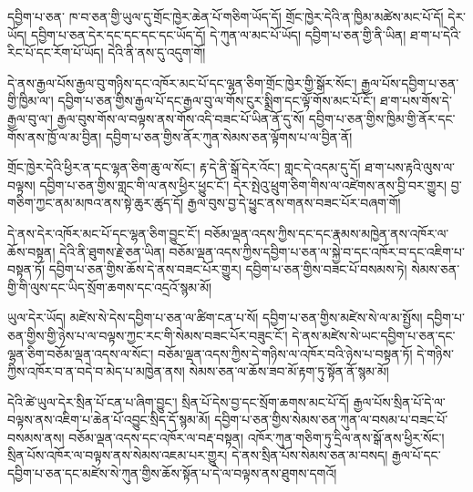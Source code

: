 \documentclass[12pt]{nextbook}
\begin{document}
\begin{readersection}{དབྱིག་པ་ཅན་}
ཁ་བ་ཅན་གྱི་ཡུལ་དུ་གྲོང་ཁྱེར་ཆེན་པོ་གཅིག་ཡོད་དོ། གྲོང་ཁྱེར་དེའི་ན་ཁྱིམ་མཚེས་མང་པོ་དོ། དེར་ཡོད། དབྱིག་པ་ཅན་དེར་དང་དང་དང་དང་ཡོད་དོ། དེ་ཀུན་ལ་མང་པོ་ཡོད། དབྱིག་པ་ཅན་གྱི་ནི་ཡིན། ཐ་ག་པ་དེའི་རིང་པོ་དང་རོག་པོ་ཡོད། དེའི་ནི་ནས་དུ་འདུག་གོ།

དེ་ནས་རྒྱལ་པོས་རྒྱལ་བུ་གཉིས་དང་འཁོར་མང་པོ་དང་ལྷན་ཅིག་གྲོང་ཁྱེར་གྱི་སྒོར་སོང་། རྒྱལ་པོས་དབྱིག་པ་ཅན་གྱི་ཁྱིམ་ལ་། དབྱིག་པ་ཅན་གྱིས་རྒྱལ་པོ་དང་རྒྱལ་བུ་ལ་གོས་ངུར་སྨྲིག་དང་ལྟོ་གོས་མང་པོ་ངོ་། ཐ་ག་པས་གོས་དེ་རྒྱལ་བུ་ལ་། རྒྱལ་བུས་གོས་ལ་བལྟས་ནས་གོས་འདི་བཟང་པོ་ཡིན་ནོ་དུ་སོ། དབྱིག་པ་ཅན་གྱིས་ཁྱིམ་གྱི་ནོར་དང་གོས་ནས་ཁྱོ་ལ་མ་བྱིན། དབྱིག་པ་ཅན་གྱིས་ནོར་ཀུན་སེམས་ཅན་ལྟོགས་པ་ལ་བྱིན་ནོ།

གྲོང་ཁྱེར་དེའི་ཕྱིར་ན་དང་ལྷན་ཅིག་ཆུ་ལ་སོང་། རྟ་དེ་ནི་སྒོ་དེར་འོང་། གླང་དེ་འདམ་དུ་དོ། ཐ་ག་པས་རྟའི་ལུས་ལ་བལྟས། དབྱིག་པ་ཅན་གྱིས་གླང་གི་ལ་ནས་ཕྱིར་ཕྱུང་ངོ་། དེར་སྤེའུ་ཕྲུག་ཅིག་གིས་ལ་འཛེགས་ནས་བྱི་བར་གྱུར། བྱ་གཅིག་ཀྱང་ནམ་མཁའ་ནས་སྟེ་ཆུར་ཚུད་དོ། རྒྱལ་བུས་བྱ་དེ་ཕྱུང་ནས་གནས་བཟང་པོར་བཞག་གོ།

དེ་ནས་དེར་འཁོར་མང་པོ་དང་ལྷན་ཅིག་བྱུང་ངོ་། བཅོམ་ལྡན་འདས་ཀྱིས་དང་དང་རྣམས་མཁྱེན་ནས་འཁོར་ལ་ཆོས་བསྟན། དེའི་ནི་ཐུགས་རྗེ་ཅན་ཡིན། བཅོམ་ལྡན་འདས་ཀྱིས་དབྱིག་པ་ཅན་ལ་སྐྱེ་བ་དང་འཁོར་བ་དང་འཇིག་པ་བསྟན་ཏོ། དབྱིག་པ་ཅན་གྱིས་ཆོས་དེ་ནས་བཟང་པོར་གྱུར། དབྱིག་པ་ཅན་གྱིས་བཟང་པོ་བསམས་ཏེ། སེམས་ཅན་གྱི་གི་ལུས་དང་ཡིད་སྲོག་ཆགས་དང་འདྲའོ་སྙམ་མོ།

ཡུལ་དེར་ཡོད། མཛེས་སེ་དེས་དབྱིག་པ་ཅན་ལ་ཚིག་ངན་པ་སོ། དབྱིག་པ་ཅན་གྱིས་མཛེས་སེ་ལ་མ་སྤྱོས། དབྱིག་པ་ཅན་གྱིས་གྱི་ཉེས་པ་ལ་བལྟས་ཀྱང་རང་གི་སེམས་བཟང་པོར་བཟུང་ངོ་། དེ་ནས་མཛེས་སེ་ཡང་དབྱིག་པ་ཅན་དང་ལྷན་ཅིག་བཅོམ་ལྡན་འདས་ལ་སོང་། བཅོམ་ལྡན་འདས་ཀྱིས་དེ་གཉིས་ལ་འཁོར་བའི་ཉེས་པ་བསྟན་ཏོ། དེ་གཉིས་ཀྱིས་འཁོར་བ་ན་བདེ་བ་མེད་པ་མཁྱེན་ནས། སེམས་ཅན་ལ་ཆོས་ཟབ་མོ་རྟག་ཏུ་སྟོན་ནོ་སྙམ་མོ།

དེའི་ཚེ་ཡུལ་དེར་སྲིན་པོ་ངན་པ་ཞིག་བྱུང་། སྲིན་པོ་དེས་བྱ་དང་སྲོག་ཆགས་མང་པོ་དོ། རྒྱལ་པོས་སྲིན་པོ་དེ་ལ་བལྟས་ནས་འཇིག་པ་ཆེན་པོ་འབྱུང་སྲིད་དོ་སྙམ་མོ། དབྱིག་པ་ཅན་གྱིས་སེམས་ཅན་ཀུན་ལ་བསམ་པ་བཟང་པོ་བསམས་ནས། བཅོམ་ལྡན་འདས་དང་འཁོར་ལ་བརྡ་བསྟན། འཁོར་ཀུན་གཅིག་ཏུ་དྲིལ་ནས་སྒོ་ནས་ཕྱིར་སོང་། སྲིན་པོས་འཁོར་ལ་བལྟས་ནས་སེམས་འཇམ་པར་གྱུར། དེ་ནས་སྲིན་པོས་སེམས་ཅན་མ་བསད། རྒྱལ་པོ་དང་དབྱིག་པ་ཅན་དང་མཛེས་སེ་ཀུན་གྱིས་ཆོས་སྟོན་པ་དེ་ལ་བལྟས་ནས་ཐུགས་དགའོ།
\end{readersection}
\end{document}
